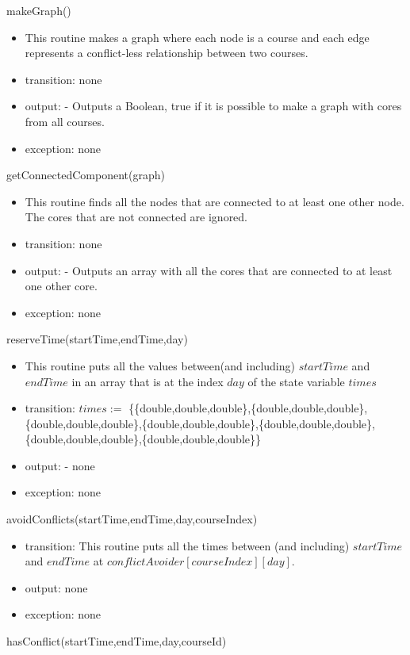 \documentclass[11pt, oneside]{article}
\begin{document}
\noindent
makeGraph()
\begin{itemize}
\item This routine makes a graph where each node is a course and each edge represents a conflict-less relationship between two courses.
\item transition: none
\item output: - Outputs a Boolean, true if it is possible to make a graph with cores from all courses.
 \item exception: none
\end{itemize}

\noindent
getConnectedComponent(graph)
\begin{itemize}
\item This routine finds all the nodes that are connected to at least one other node. The cores that are not connected are ignored.
\item transition: none
\item output: - Outputs an array with all the cores that are connected to at least one other core.
 \item exception: none
\end{itemize}

\noindent
reserveTime(startTime,endTime,day)
\begin{itemize}
\item This routine puts all the values between(and including) $startTime$ and $endTime$ in an array that is at the index $day$ of the state variable $times$
\item transition: $times:=$ \{\{double,double,double\},\{double,double,double\},\{double,double,double\},\newline\{double,double,double\},\{double,double,double\},\{double,double,double\},\{double,double,double\}\}
\item output: - none
 \item exception: none
\end{itemize}

\noindent
avoidConflicts(startTime,endTime,day,courseIndex)
\begin{itemize}
\item transition: This routine puts all the times between (and including) $startTime$ and $endTime$ at $conflictAvoider[courseIndex][day]$.
\item output: none
 \item exception: none
\end{itemize}

\noindent
hasConflict(startTime,endTime,day,courseId)
\\
\end{document}
